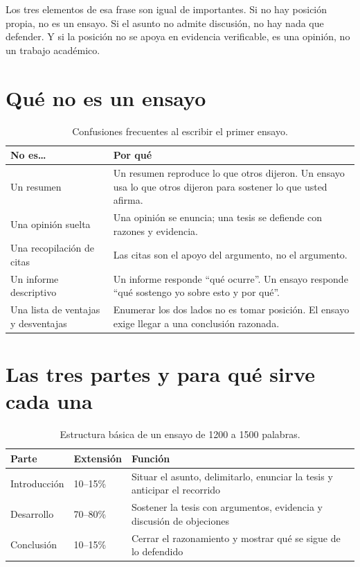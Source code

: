 \documentclass[12pt,a4paper,openany]{report}
\begin{document}
Los tres elementos de esa frase son igual de importantes. Si no hay posici\'on propia, no es un ensayo. Si el asunto no admite discusi\'on, no hay nada que defender. Y si la posici\'on no se apoya en evidencia verificable, es una opini\'on, no un trabajo acad\'emico.

\section{Qu\'e no es un ensayo}

\begin{table}[htbp]
	\centering
	\caption{Confusiones frecuentes al escribir el primer ensayo.}
	\label{tab:noesensayo}
	\small
	\begin{tabular}{L{4.0cm} L{9.8cm}}
		\toprule
		\textbf{No es\ldots} & \textbf{Por qu\'e} \\
		\midrule
		Un resumen & Un resumen reproduce lo que otros dijeron. Un ensayo usa lo que otros dijeron para sostener lo que usted afirma. \\
		Una opini\'on suelta & Una opini\'on se enuncia; una tesis se defiende con razones y evidencia. \\
		Una recopilaci\'on de citas & Las citas son el apoyo del argumento, no el argumento. \\
		Un informe descriptivo & Un informe responde ``qu\'e ocurre''. Un ensayo responde ``qu\'e sostengo yo sobre esto y por qu\'e''. \\
		Una lista de ventajas y desventajas & Enumerar los dos lados no es tomar posici\'on. El ensayo exige llegar a una conclusi\'on razonada. \\
		\bottomrule
	\end{tabular}
\end{table}

\section{Las tres partes y para qu\'e sirve cada una}

\begin{table}[htbp]
	\centering
	\caption{Estructura b\'asica de un ensayo de 1200 a 1500 palabras.}
	\label{tab:estructura}
	\small
	\begin{tabular}{L{3.0cm} C{2.4cm} L{8.4cm}}
		\toprule
		\textbf{Parte} & \textbf{Extensi\'on} & \textbf{Funci\'on} \\
		\midrule
		Introducci\'on & 10--15\% & Situar el asunto, delimitarlo, enunciar la tesis y anticipar el recorrido \\
		Desarrollo & 70--80\% & Sostener la tesis con argumentos, evidencia y discusi\'on de objeciones \\
		Conclusi\'on & 10--15\% & Cerrar el razonamiento y mostrar qu\'e se sigue de lo defendido \\
		\bottomrule
	\end{tabular}
\end{table}
\end{document}
